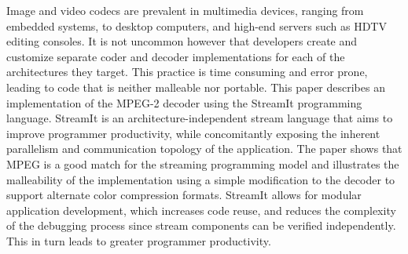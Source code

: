 \vspace{-6pt}
Image and video codecs are prevalent in multimedia devices, ranging
from embedded systems, to desktop computers, and high-end servers such
as HDTV editing consoles. It is not uncommon however that developers
create and customize separate coder and decoder implementations for
each of the architectures they target. This practice is time 
consuming and error prone, leading to
code that is neither malleable nor portable. This paper describes an
implementation of the MPEG-2 decoder using the StreamIt programming
language. StreamIt is an architecture-independent stream language that
aims to improve programmer productivity, while concomitantly exposing
the inherent parallelism and communication topology of the
application. The paper shows that MPEG is a good match for the
streaming programming model and illustrates the malleability of the
implementation using a simple modification to the decoder to support
alternate color compression formats. StreamIt allows for modular
application development, which increases code reuse, and reduces the
complexity of the debugging process since stream components can be
verified independently. This in turn leads to greater programmer
productivity.
